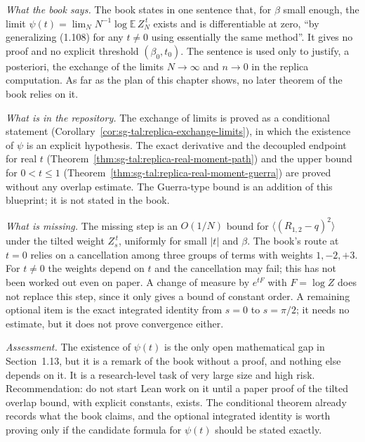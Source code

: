 \begin{remark}\label{rem:sg-tal:replica-real-moment-priority}
\emph{What the book says.} The book states in one sentence that, for $\beta$ small enough, the limit
$\psi(t)=\lim_N N^{-1}\log\mathbb E\,Z_N^{\,t}$ exists and is differentiable at zero, ``by generalizing (1.108)
for any $t\ne0$ using essentially the same method''. It gives no proof and no explicit threshold
$(\beta_0,t_0)$. The sentence is used only to justify, a posteriori, the exchange of the limits
$N\to\infty$ and $n\to0$ in the replica computation. As far as the plan of this chapter shows, no later
theorem of the book relies on it.

\emph{What is in the repository.} The exchange of limits is proved as a conditional statement
(Corollary~\ref{cor:sg-tal:replica-exchange-limits}), in which the existence of $\psi$ is an explicit hypothesis.
The exact derivative and the decoupled endpoint for real $t$
(Theorem~\ref{thm:sg-tal:replica-real-moment-path}) and the upper bound for $0<t\le1$
(Theorem~\ref{thm:sg-tal:replica-real-moment-guerra}) are proved without any overlap estimate.
The Guerra-type bound is an addition of this blueprint; it is not stated in the book.

\emph{What is missing.} The missing step is an $O(1/N)$ bound for $\langle(R_{1,2}-q)^2\rangle$ under the
tilted weight $Z_s^{\,t}$, uniformly for small $|t|$ and $\beta$. The book's route at $t=0$ relies on a
cancellation among three groups of terms with weights $1,-2,+3$. For $t\ne0$ the weights depend on $t$ and
the cancellation may fail; this has not been worked out even on paper. A change of measure by $e^{tF}$ with
$F=\log Z$ does not replace this step, since it only gives a bound of constant order.
A remaining optional item is the exact integrated identity from $s=0$ to $s=\pi/2$; it needs no estimate,
but it does not prove convergence either.

\emph{Assessment.} The existence of $\psi(t)$ is the only open mathematical gap in Section~1.13, but it
is a remark of the book without a proof, and nothing else depends on it. It is a research-level task of very
large size and high risk. Recommendation: do not start Lean work on it until a paper proof of the tilted
overlap bound, with explicit constants, exists. The conditional theorem already records what the book
claims, and the optional integrated identity is worth proving only if the candidate formula for $\psi(t)$
should be stated exactly.
\end{remark}


